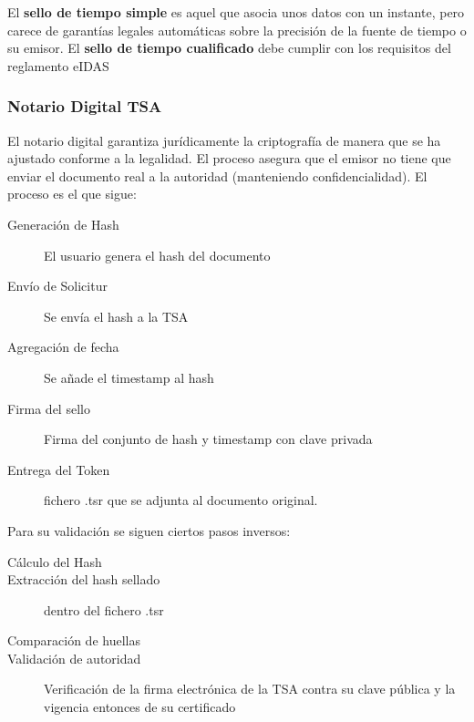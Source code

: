         El \textbf{sello de tiempo simple} es aquel que asocia unos datos con un instante, pero carece de garantías legales automáticas sobre la precisión de la fuente de tiempo o su emisor. El \textbf{sello de tiempo cualificado} debe cumplir con los requisitos del reglamento eIDAS

    \subsubsection{Notario Digital TSA}
        El notario digital garantiza jurídicamente la criptografía de manera que se ha ajustado conforme a la legalidad. El proceso asegura que el emisor no tiene que enviar el documento real a la autoridad (manteniendo confidencialidad). El proceso es el que sigue:
        \begin{description}
            \item[Generación de Hash] El usuario genera el hash del documento
            \item[Envío de Solicitur] Se envía el hash a la TSA
            \item[Agregación de fecha] Se añade el timestamp al hash
            \item[Firma del sello] Firma del conjunto de hash y timestamp con clave privada
            \item[Entrega del Token] fichero .tsr que se adjunta al documento original.
        \end{description}
        Para su validación se siguen ciertos pasos inversos:
        \begin{description}
            \item[Cálculo del Hash] 
            \item[Extracción del hash sellado] dentro del fichero .tsr
            \item[Comparación de huellas]
            \item[Validación de autoridad] Verificación de la firma electrónica de la TSA contra su clave pública y la vigencia entonces de su certificado
        \end{description}
